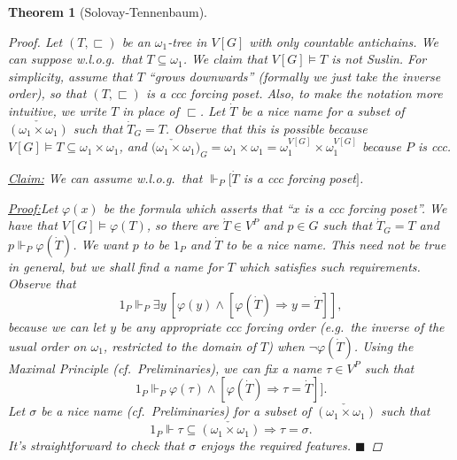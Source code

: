 \documentclass[11pt,a4paper]{report}
\newtheorem{theorem}{Theorem}[chapter] %
\theoremstyle{definition}
\theoremstyle{num.custom-title}
\theoremstyle{custom-title}
\newenvironment{claim}[1]{\par\noindent\underline{Claim#1:}\space}{} %
\newenvironment{claimproof}[1]{\par\noindent\underline{Proof:}\space#1}{\leavevmode\unskip\penalty9999 \hbox{}\nobreak\hfill\quad\hbox{$\blacksquare$}} %
\DeclareMathOperator{\imp}{\Rightarrow}
\DeclareMathOperator{\sse}{\subseteq}
\DeclareMathOperator{\restr}{\upharpoonright}
\newcommand*{\defeq}{\mathrel{\rlap{%
                     \raisebox{0.3ex}{$\cdot$}}%
                     \raisebox{-0.3ex}{$\cdot$}}%
                     =}
\renewcommand{\phi}{\varphi}
\newcommand{\forces}{\Vdash}
\begin{document}
\begin{theorem}[Solovay-Tennenbaum]
\begin{proof}
Let $(T,\sqsubset)$ be an $\omega_1$-tree in $V[G]$ with only countable antichains. We can suppose w.l.o.g.\ that $T \sse \omega_1$. We claim that $V[G] \models T$ is not Suslin. For simplicity, assume that $T$ ``grows downwards'' (formally we just take the inverse order), so that $(T,\sqsubset)$ is a ccc forcing poset. Also, to make the notation more intuitive, we write $T$ in place of $\sqsubset$. Let $\dot{T}$ be a nice name for a subset of $\check{(\omega_1 \times \omega_1)}$ such that $\dot{T}_G = T$. Observe that this is possible because $V[G] \models T \sse \omega_1 \times \omega_1$, and $\check{(\omega_1 \times \omega_1})_G = \omega_1 \times \omega_1 = \omega_1^{V[G]} \times \omega_1^{V[G]}$ because $P$ is ccc.
\\[-10pt]
\begin{claim}{}
We can assume w.l.o.g.\ that $\forces_P [\dot{T}$ is a ccc forcing poset$]$.
\begin{claimproof}
Let $\phi(x)$ be the formula which asserts that ``$x$ is a ccc forcing poset''. We have that $V[G] \models \phi(T)$, so there are $\dot{T} \in V^P$ and $p \in G$ such that $\dot{T}_G = T$ and $p \forces_P \phi(\dot{T})$. We want $p$ to be $1_P$ and $\dot{T}$ to be a nice name. This need not be true in general, but we shall find a name for $T$ which satisfies such requirements. Observe that
\[
1_P \forces_P \exists y \ [\phi(y) \wedge [\phi(\dot{T}) \imp y = \dot{T}]],
\]
because we can let $y$ be any appropriate ccc forcing order (e.g.\ the inverse of the usual order on $\omega_1$, restricted to the domain of $T$) when $\neg \phi(\dot{T})$. Using the Maximal Principle (cf.\ Preliminaries), we can fix a name $\tau \in V^P$ such that
\[
1_P \forces_P \phi(\tau) \wedge [\phi(\dot{T}) \imp \tau = \dot{T}]].
\]
Let $\sigma$ be a nice name (cf.\ Preliminaries) for a subset of $\check{(\omega_1 \times \omega_1)}$ such that
\[
1_P \forces \tau \sse \check{(\omega_1 \times \omega_1)} \imp \tau = \sigma.
\]
It's straightforward to check that $\sigma$ enjoys the required features.
\end{claimproof}
\end{claim}

\end{proof}
\end{theorem}
\end{document}
